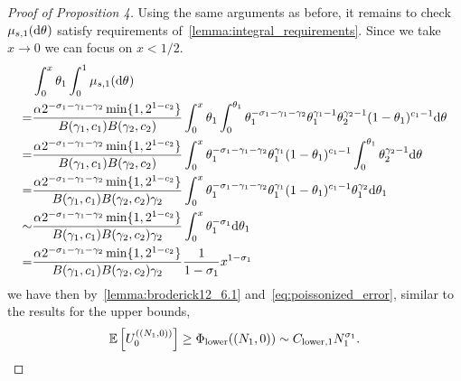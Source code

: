 \begin{proof}[Proof of Proposition 4]
Using the same arguments as before, it remains to check $\mu_{s,1}(\de\vecvariantfreq{})$ satisfy requirements of~\cref{lemma:integral_requirements}. Since we take $x\to 0$ we can focus on $x<1/2$. 
\begin{align*}
    &\int_0^x \variantfreqperpop{1} \int_0^1 \mu_{s,1}(\de\vecvariantfreq{})\\
    =& \frac{\mass 2^{-\rate{1}-\corr{1}-\corr{2}}\min\{1, 2^{1-\conc{2}}\}}{B(\corr{1}, \conc{1})B(\corr{2}, \conc{2})}\int_0^x \variantfreqperpop{1} \int_0^{\variantfreqperpop{1}} \variantfreqperpop{1}^{-\rate{1}-\corr{1}-\corr{2}} \variantfreqperpop{1}^{\corr{1}-1}\variantfreqperpop{2}^{\corr{2}-1}(1-\variantfreqperpop{1})^{\conc{1}-1}\de\vecvariantfreq{}\\
    =& \frac{\mass 2^{-\rate{1}-\corr{1}-\corr{2}}\min\{1, 2^{1-\conc{2}}\}}{B(\corr{1}, \conc{1})B(\corr{2}, \conc{2})}\int_0^x \variantfreqperpop{1}^{-\rate{1}-\corr{1}-\corr{2}} \variantfreqperpop{1}^{\corr{1}} (1-\variantfreqperpop{1})^{\conc{1}-1} \int_0^{\variantfreqperpop{1}} \variantfreqperpop{2}^{\corr{2}-1}\de\vecvariantfreq{}\\
    =&\frac{\mass 2^{-\rate{1}-\corr{1}-\corr{2}}\min\{1, 2^{1-\conc{2}}\}}{B(\corr{1}, \conc{1})B(\corr{2}, \conc{2})\corr{2}}\int_0^x \variantfreqperpop{1}^{-\rate{1}-\corr{1}-\corr{2}} \variantfreqperpop{1}^{\corr{1}} (1-\variantfreqperpop{1})^{\conc{1}-1} \variantfreqperpop{1}^{\corr{2}}\de\variantfreqperpop{1}\\
    \sim & \frac{\mass 2^{-\rate{1}-\corr{1}-\corr{2}}\min\{1, 2^{1-\conc{2}}\}}{B(\corr{1}, \conc{1})B(\corr{2}, \conc{2})\corr{2}}\int_0^x \variantfreqperpop{1}^{-\rate{1}} \de\variantfreqperpop{1}\\
    =& \frac{\mass 2^{-\rate{1}-\corr{1}-\corr{2}}\min\{1, 2^{1-\conc{2}}\}}{B(\corr{1}, \conc{1})B(\corr{2}, \conc{2})\corr{2}} \frac{1}{1-\rate{1}}x^{1-\rate{1}}
\end{align*}
we have then by~\cref{lemma:broderick12_6.1} and~\cref{eq:poissonized_error}, similar to the results for the upper bounds,
\begin{equation}
   \E\left[ \news{\zerovec}{(\samplesize{1}, 0)} \right] \ge \lowerbound((\samplesize{1}, 0))\sim \constantlower{1} \samplesize{1}^{\rate{1}} .
   \label{eq:lowerbound_2g1_pop1}
\end{equation}



\end{proof}

